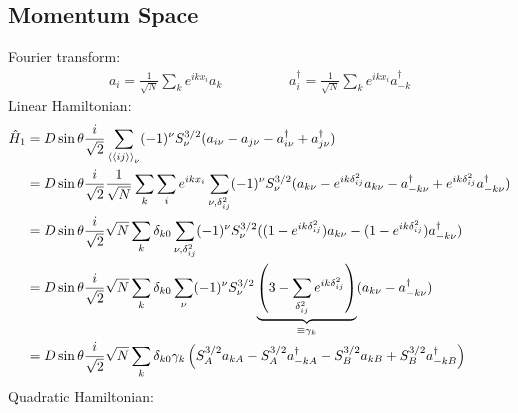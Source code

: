 \documentclass{article}
\begin{document}
\subsection{Momentum Space}
Fourier transform:
\begin{align}
	a_i = \frac{1}{\sqrt N} \sum_k e^{ikx_i} a_k \hspace{2cm} a_i^\dagger = \frac{1}{\sqrt N} \sum_k e^{ikx_i} a_{-k}^\dagger
\end{align}
Linear Hamiltonian:
\begin{align}
	\hat H_1 &= D \sin\theta \frac{i}{\sqrt 2} \sum_{\braket{\braket{ij}}_\nu} (-1)^\nu S_\nu^{3/2} (a_{i\nu} - a_{j\nu} - a_{i\nu}^\dagger + a_{j\nu}^\dagger) \\
%
	&= D \sin\theta \frac{i}{\sqrt 2} \frac{1}{\sqrt N} \sum_k \sum_{i} e^{ikx_i} \sum_{\nu, \delta_{ij}^2} (-1)^\nu S_\nu^{3/2} (a_{k\nu} - e^{ik\delta_{ij}^2} a_{k\nu} - a_{-k\nu}^\dagger + e^{ik\delta_{ij}^2} a_{-k\nu}^\dagger) \\
%
	&= D \sin\theta \frac{i}{\sqrt 2} \sqrt N \sum_k \delta_{k0} \sum_{\nu, \delta_{ij}^2} (-1)^\nu S_\nu^{3/2} ((1 - e^{ik\delta_{ij}^2}) a_{k\nu} - (1 - e^{ik\delta_{ij}^2}) a_{-k\nu}^\dagger) \\
%
	&= D \sin\theta \frac{i}{\sqrt 2} \sqrt N \sum_k \delta_{k0} \sum_{\nu} (-1)^\nu S_\nu^{3/2} \underbrace{\left(3 - \sum_{\delta_{ij}^2} e^{ik\delta_{ij}^2}\right)}_{\equiv \gamma_{k}} (a_{k\nu} - a_{-k\nu}^\dagger) \\
%
	&= D \sin\theta \frac{i}{\sqrt 2} \sqrt N \sum_k \delta_{k0} \gamma_k \left(S_A^{3/2} a_{kA} - S_A^{3/2} a_{-kA}^\dagger - S_B^{3/2} a_{kB} + S_B^{3/2} a_{-kB}^\dagger \right)
\end{align}
Quadratic Hamiltonian:
\end{document}
